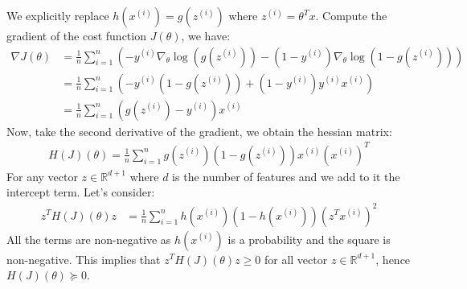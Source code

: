 \begin{answer}
We explicitly replace $h(x^{(i)}) = g(z^{(i)})$ where $z^{(i)} = \theta^{T} x$. Compute the gradient of the cost function $J(\theta)$, we have:
%
\begin{align}
	\nabla J(\theta) 
	&= \frac{1}{n} \sum \limits_{i = 1}^{n} \left(-y^{(i)} \nabla_{\theta}\log(g(z^{(i)})) - (1 - y^{(i)}) \nabla_{\theta}\log(1 - g(z^{(i)}))\right) \\
	&= \frac{1}{n} \sum \limits_{i = 1}^{n} \left(-y^{(i)}(1 - g(z^{(i)})) + (1 - y^{(i)}) y^{(i)} x^{(i)}\right) \\
	&= \frac{1}{n} \sum \limits_{i = 1}^{n} (g(z^{(i)}) - y^{(i)}) x^{(i)}
\end{align}
%
Now, take the second derivative of the gradient, we obtain the hessian matrix:
%
\begin{align}
	H(J)(\theta) 
	= \frac{1}{n} \sum \limits_{i = 1}^{n} g(z^{(i)})(1 - g(z^{(i)})) x^{(i)} (x^{(i)})^T
\end{align}
%
For any vector $z \in \mathbb{R}^{d + 1}$ where $d$ is the number of features and we add to it the intercept term. Let's consider:
%
\begin{align}
	z^{T} H(J)(\theta) z
	&= \frac{1}{n} \sum \limits_{i = 1}^{n} h(x^{(i)})(1 - h(x^{(i)})) (z^{T} x^{(i)})^2
\end{align}
%
All the terms are non-negative as $h(x^{(i)})$ is a probability and the square is non-negative. This implies that $z^{T} H(J)(\theta) z \ge 0$ for all vector $z \in \mathbb{R}^{d + 1}$, hence $H(J)(\theta) \succeq 0$. \\
\end{answer}




















